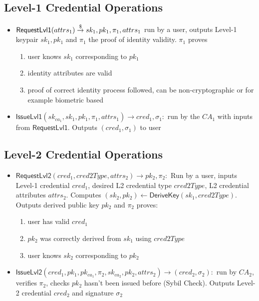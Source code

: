 \subsection{Level-1 Credential Operations}
\begin{itemize}
    \item $\mathsf{RequestLvl1}(attrs_1) \stackrel{\$}{\to} sk_1, pk_1, \pi_{1}, attrs_1$ run by a user, outputs Level-1 keypair $sk_1, pk_1$ and $\pi_{1}$ the proof of identity validity. $\pi_1$ proves 
    \begin{enumerate}
        \item user knows $sk_1$ corresponding to $pk_1$
        \item identity attributes are valid
        \item proof of correct identity process followed, can be non-cryptographic or for example biometric based
    \end{enumerate}

    \item $\mathsf{IssueLvl1}(sk_{ca_1}, sk_1, pk_1, \pi_{1}, attrs_1) \to cred_1, \sigma_1:$ run by the $CA_1$ with inputs from $\mathsf{RequestLvl1}$. Outputs $(cred_1, \sigma_1)$ to user
\end{itemize}


\subsection{Level-2 Credential Operations}
\begin{itemize}
    \item $\mathsf{RequestLvl2}(cred_1, cred2Type, attrs_2) \to pk_2, \pi_{2}:$ Run by a user, inputs Level-1 credential $cred_1$, desired L2 credential type $cred2Type$, L2 credential attributes $attrs_2$. Computes $(sk_2, pk_2) \gets \mathsf{DeriveKey}(sk_1, cred2Type)$. Outputs derived public key $pk_2$ and $\pi_2$ proves:
    \begin{enumerate}
        \item user has valid $cred_1$
        \item $pk_2$ was correctly derived from $sk_1$ using $cred2Type$
        \item user knows $sk_2$ corresponding to $pk_2$
    \end{enumerate}

    \item $\mathsf{IssueLvl2}(cred_1, pk_1, pk_{ca_1}, \pi_2, sk_{ca_2}, pk_2, attrs_2) \to (cred_2, \sigma_2): $ run by $CA_2$, verifies $\pi_2$, checks $pk_2$ hasn't been issued before (Sybil Check). Outputs Level-2 credential $cred_2$ and signature $\sigma_2$
\end{itemize}



